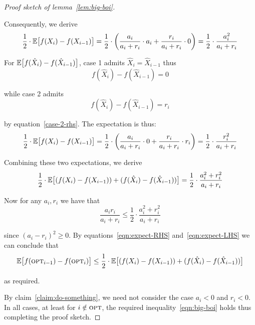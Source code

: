 \documentclass{article}
\begin{document}
\begin{proof}[Proof sketch of lemma~\ref{lem:big-boi}]
\begin{enumerate}
Consequently, we derive
\begin{equation*}
\frac{1}{2} \cdot \mathbb{E} \big[ f(X_i) - f(X_{i-1}) \big]
= \frac{1}{2} \cdot \bigg( \frac{a_i}{a_i + r_i} \cdot a_i + \frac{r_i}{a_i + r_i} \cdot 0 \bigg)
= \frac{1}{2} \cdot \frac{a_i^2}{a_i + r_i}
\end{equation*}

For $\mathbb{E} \big[ f(\hat{X}_i) - f(\hat{X}_{i-1}) \big]$, case 1 admits $\hat{X}_i = \hat{X}_{i-1}$ thus
\begin{equation*}
f(\hat{X}_i) - f(\hat{X}_{i-1}) = 0
\end{equation*}

while case 2 admits
\begin{equation}
f(\hat{X}_i) - f(\hat{X}_{i-1}) = r_i
\end{equation}

by equation~\ref{case-2-rhs}. The expectation is thus:
\begin{equation*}
\frac{1}{2} \cdot \mathbb{E} \big[ f(X_i) - f(X_{i-1}) \big]
= \frac{1}{2} \cdot \bigg( \frac{a_i}{a_i + r_i} \cdot 0 + \frac{r_i}{a_i + r_i} \cdot r_i \bigg)
= \frac{1}{2} \cdot \frac{r_i^2}{a_i + r_i}
\end{equation*}

Combining these two expectations, we derive
\begin{equation}\label{eqn:expect-RHS}
\frac{1}{2} \cdot \mathbb{E} \big[ ( f(X_i) - f(X_{i-1}) ) + ( f(\hat{X}_i) - f(\hat{X}_{i-1}) ) \big]
= \frac{1}{2} \cdot \frac{a_i^2 + r_i^2}{a_i + r_i}
\end{equation}

Now for any $a_i, r_i$ we have that
\begin{equation*}
\frac{a_i r_i}{a_i + r_i}
\leq \frac{1}{2} \cdot \frac{a_i^2 + r_i^2}{a_i + r_i}
\end{equation*}

since $(a_i - r_i)^2 \geq 0$. By equations~\ref{eqn:expect-RHS} and~\ref{eqn:expect-LHS} we can conclude that
\begin{equation*}
\mathbb{E} \big[ f(\textup{\textsc{opt}}_{i-1}) - f(\textup{\textsc{opt}}_i) \big]
\leq \frac{1}{2} \cdot \mathbb{E} \big[ ( f(X_i) - f(X_{i-1}) ) + ( f(\hat{X}_i) - f(\hat{X}_{i-1}) ) \big]
\end{equation*}

as required.
\end{enumerate}

By claim~\ref{claim:do-something}, we need not consider the case $a_i < 0$ and $r_i < 0$. In all cases, at least for $i \notin \textup{\textsc{opt}}$, the required inequality~\ref{eqn:big-boi} holds thus completing the proof sketch.
\end{proof}
\end{document}
